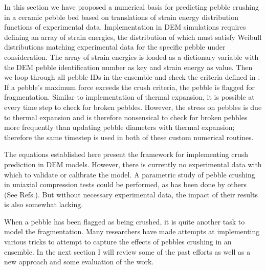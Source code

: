 In this section we have proposed a numerical basis for predicting pebble crushing in a ceramic pebble bed based on translations of strain energy distribution functions of experimental data. Implementation in DEM simulations requires defining an array of strain energies, the distribution of which must satisfy Weibull distributions matching experimental data for the specific pebble under consideration. The array of strain energies is loaded as a dictionary variable with the DEM pebble identification number as key and strain energy as value. Then we loop through all pebble IDs in the ensemble and check the criteria defined in . If a pebble's maximum force exceeds the crush criteria, the pebble is flagged for fragmentation. Similar to implementation of thermal expansion, it is possible at every time step to check for broken pebbles. However, the stress on pebbles is due to thermal expansion and is therefore nonsensical to check for broken pebbles more frequently than updating pebble diameters with thermal expansion; therefore the same timestep is used in both of these custom numerical routines. 

The equations established here present the framework for implementing crush prediction in DEM models. However, there is currently no experimental data with which to validate or calibrate the model. A parametric study of pebble crushing in uniaxial compression tests could be performed, as has been done by others (See Refs.\cite{Annabattula2012a,Zhao2013}). But without necessary experimental data, the impact of their results is also somewhat lacking.

When a pebble has been flagged as being crushed, it is quite another task to model the fragmentation. Many researchers have made attempts at implementing various tricks to attempt to capture the effects of pebbles crushing in an ensemble. In the next section I will review some of the past efforts as well as a new approach and some evaluation of the work.